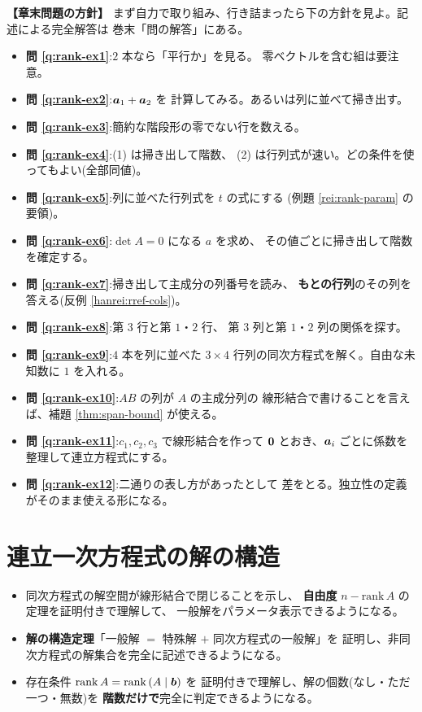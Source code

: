 \bigskip
{\small
\noindent\textbf{【章末問題の方針】}\quad
まず自力で取り組み、行き詰まったら下の方針を見よ。記述による完全解答は
巻末「問の解答」にある。
\begin{itemize}
\item \textbf{問 \ref{q:rank-ex1}}:$2$ 本なら「平行か」を見る。
零ベクトルを含む組は要注意。
\item \textbf{問 \ref{q:rank-ex2}}:$\bm{a}_1 + \bm{a}_2$ を
計算してみる。あるいは列に並べて掃き出す。
\item \textbf{問 \ref{q:rank-ex3}}:簡約な階段形の零でない行を数える。
\item \textbf{問 \ref{q:rank-ex4}}:(1) は掃き出して階数、
(2) は行列式が速い。どの条件を使ってもよい(全部同値)。
\item \textbf{問 \ref{q:rank-ex5}}:列に並べた行列式を $t$ の式にする
(例題 \ref{rei:rank-param} の要領)。
\item \textbf{問 \ref{q:rank-ex6}}:$\det A = 0$ になる $a$ を求め、
その値ごとに掃き出して階数を確定する。
\item \textbf{問 \ref{q:rank-ex7}}:掃き出して主成分の列番号を読み、
\textbf{もとの行列}のその列を答える(反例 \ref{hanrei:rref-cols})。
\item \textbf{問 \ref{q:rank-ex8}}:第 $3$ 行と第 $1$・$2$ 行、
第 $3$ 列と第 $1$・$2$ 列の関係を探す。
\item \textbf{問 \ref{q:rank-ex9}}:$4$ 本を列に並べた $3 \times 4$
行列の同次方程式を解く。自由な未知数に $1$ を入れる。
\item \textbf{問 \ref{q:rank-ex10}}:$AB$ の列が $A$ の主成分列の
線形結合で書けることを言えば、補題 \ref{thm:span-bound} が使える。
\item \textbf{問 \ref{q:rank-ex11}}:$c_1, c_2, c_3$ で線形結合を作って
$\bm{0}$ とおき、$\bm{a}_i$ ごとに係数を整理して連立方程式にする。
\item \textbf{問 \ref{q:rank-ex12}}:二通りの表し方があったとして
差をとる。独立性の定義がそのまま使える形になる。
\end{itemize}
}

\chapter{連立一次方程式の解の構造}\label{chap:structure}

\begin{goal}
\begin{itemize}
\item 同次方程式の解空間が線形結合で閉じることを示し、
\textbf{自由度} $n - \mathrm{rank}\,A$ の定理を証明付きで理解して、
一般解をパラメータ表示できるようになる。
\item \textbf{解の構造定理}「一般解 $=$ 特殊解 $+$ 同次方程式の一般解」を
証明し、非同次方程式の解集合を完全に記述できるようになる。
\item 存在条件 $\mathrm{rank}\,A = \mathrm{rank}\,(A \mid \bm{b})$ を
証明付きで理解し、解の個数(なし・ただ一つ・無数)を
\textbf{階数だけで}完全に判定できるようになる。
\end{itemize}
\end{goal}

